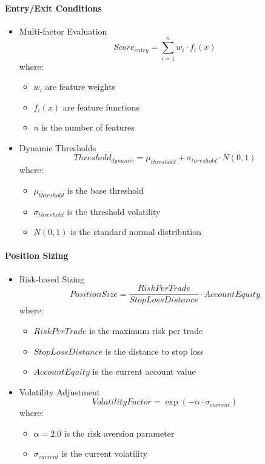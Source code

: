 \documentclass[conference]{IEEEtran}
\begin{document}
\paragraph{Entry/Exit Conditions}
\begin{itemize}
    \item Multi-factor Evaluation
    \begin{equation}
    Score_{entry} = \sum_{i=1}^n w_i \cdot f_i(x)
    \end{equation}
    where:
    \begin{itemize}
        \item $w_i$ are feature weights
        \item $f_i(x)$ are feature functions
        \item $n$ is the number of features
    \end{itemize}
    
    \item Dynamic Thresholds
    \begin{equation}
    Threshold_{dynamic} = \mu_{threshold} + \sigma_{threshold} \cdot N(0,1)
    \end{equation}
    where:
    \begin{itemize}
        \item $\mu_{threshold}$ is the base threshold
        \item $\sigma_{threshold}$ is the threshold volatility
        \item $N(0,1)$ is the standard normal distribution
    \end{itemize}
\end{itemize}

\paragraph{Position Sizing}
\begin{itemize}
    \item Risk-based Sizing
    \begin{equation}
    PositionSize = \frac{RiskPerTrade}{StopLossDistance} \cdot AccountEquity
    \end{equation}
    where:
    \begin{itemize}
        \item $RiskPerTrade$ is the maximum risk per trade
        \item $StopLossDistance$ is the distance to stop loss
        \item $AccountEquity$ is the current account value
    \end{itemize}
    
    \item Volatility Adjustment
    \begin{equation}
    VolatilityFactor = \exp(-\alpha \cdot \sigma_{current})
    \end{equation}
    where:
    \begin{itemize}
        \item $\alpha = 2.0$ is the risk aversion parameter
        \item $\sigma_{current}$ is the current volatility
    \end{itemize}
\end{itemize}
\end{document}
